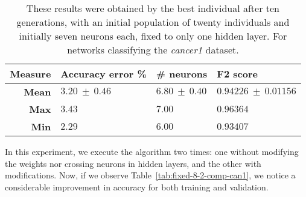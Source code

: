 \documentclass[runningheads]{llncs}
\begin{document}
 \begin{table}
     \centering
     \caption{
These results were obtained by the best individual after ten generations, with
an initial population of twenty individuals and initially seven neurons each, fixed to 
only one hidden layer. For networks classifying the \emph{cancer1} dataset.}
     \label{tab:fixed-7-1-inicial-can1}
     \begin{tabular}{rlll}
         \textbf{Measure}   & \textbf{Accuracy error \%} & \textbf{\# neurons} & \textbf{F2 score} \\
         \hline
         \textbf{Mean}      & $3.20\ \pm\ 0.46$      & $6.80\ \pm\ 0.40$       & $0.94226\ \pm\ 0.01156$ \\
         \textbf{Max}       & $3.43$                 & $7.00$                  & $0.96364$               \\
         \textbf{Min}       & $2.29$                 & $6.00$                  & $0.93407$               \\
     \end{tabular}
 \end{table}


In this experiment, we execute the algorithm two times: one without modifying
the weights nor crossing neurons in hidden layers, and the other with
modifications. Now, if we observe Table~\autoref{tab:fixed-8-2-comp-can1}, we
notice a considerable improvement in accuracy for both training and validation.
\end{document}
